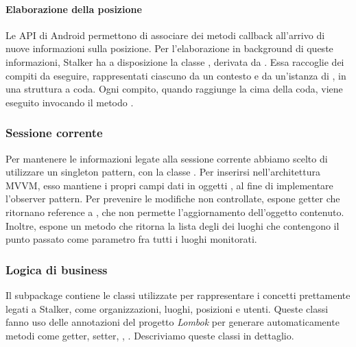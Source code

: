 \documentclass[../../manuale-manutentore.tex]{subfiles}
\begin{document}
\paragraph{Elaborazione della posizione}%
\label{par:elaborazione_della_posizione}

Le API di Android permettono di associare dei metodi callback all'arrivo di nuove informazioni sulla posizione.
Per l'elaborazione in background di queste informazioni, Stalker ha a disposizione la classe \linebreak{}, derivata da .
Essa raccoglie dei compiti da eseguire, rappresentati ciascuno da un contesto e da un'istanza di , in una struttura a coda.
Ogni compito, quando raggiunge la cima della coda, viene eseguito invocando il metodo \linebreak{}.

\subsubsection{Sessione corrente}%
\label{subs:sessione_corrente}

Per mantenere le informazioni legate alla sessione corrente abbiamo scelto di utilizzare un singleton pattern, con la classe .
Per inserirsi nell'architettura MVVM, esso mantiene i propri campi dati in oggetti , al fine di implementare l'observer pattern.
Per prevenire le modifiche non controllate, espone getter che ritornano reference a , che non permette l'aggiornamento dell'oggetto contenuto.
Inoltre, espone un metodo  che ritorna la lista degli  dei luoghi che contengono il punto passato come parametro fra tutti i luoghi monitorati.

\subsubsection{Logica di business}%
\label{subs:logica_di_business}

Il subpackage  contiene le classi utilizzate per rappresentare i concetti prettamente legati a Stalker, come organizzazioni, luoghi, posizioni e utenti.
Queste classi fanno uso delle annotazioni del progetto \textit{Lombok} per generare automaticamente metodi come getter, setter, , .
Descriviamo queste classi in dettaglio.
\end{document}
